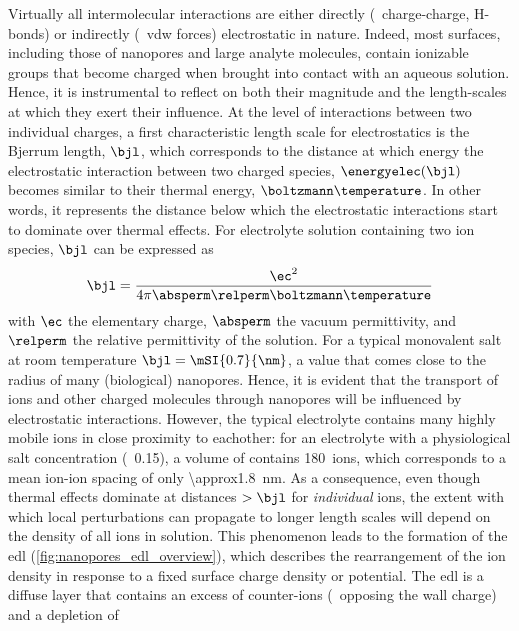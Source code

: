 
Virtually all intermolecular interactions are either directly (\eg~charge-charge, H-bonds) or indirectly
(\eg~\gls{vdw} forces) electrostatic in nature. Indeed, most surfaces, including those of nanopores and large
analyte molecules, contain ionizable groups that become charged when brought into contact with an aqueous
solution. Hence, it is instrumental to reflect on both their magnitude and the length-scales at which they
exert their influence. At the level of interactions between two individual charges, a first characteristic
length scale for electrostatics is the Bjerrum length, $\bjl$, which corresponds to the distance at which
energy the electrostatic interaction between two charged species, $\energyelec (\bjl)$ becomes similar to
their thermal energy, $\boltzmann \temperature$. In other words, it represents the distance below which the
electrostatic interactions start to dominate over thermal effects. For electrolyte solution containing two ion
species, $\bjl$ can be expressed as~\cite{Bocquet-2010}
%
\begin{equation}\label{eq:nanopores_bjerrum_length}
  \bjl = \dfrac{\ec^2}{4 \pi \absperm \relperm \boltzmann \temperature}
\end{equation}
%
with $\ec$ the elementary charge, $\absperm$ the vacuum permittivity, and $\relperm$ the relative permittivity
of the solution. For a typical monovalent salt at room temperature $\bjl = \mSI{0.7}{\nm}$, a value that comes
close to the radius of many (biological) nanopores. Hence, it is evident that the transport of ions and other
charged molecules through nanopores will be influenced by electrostatic interactions. However, the typical
electrolyte contains many highly mobile ions in close proximity to eachother: for an electrolyte with a
physiological salt concentration (\eg~\SI{0.15}{\Molar}), a volume of  contains
180~ions, which corresponds to a mean ion-ion spacing of only \SI{\approx1.8}{\nm}. As a consequence, even
though thermal effects dominate at distances $>\bjl$ for \emph{individual} ions, the extent with which local
perturbations can propagate to longer length scales will depend on the density of all ions in solution. This
phenomenon leads to the formation of the \gls{edl} (\cref{fig:nanopores_edl_overview}), which describes the
rearrangement of the ion density in response to a fixed surface charge density or potential. The \gls{edl} is
a diffuse layer that contains an excess of counter-ions (\ie~opposing the wall charge) and a depletion of
